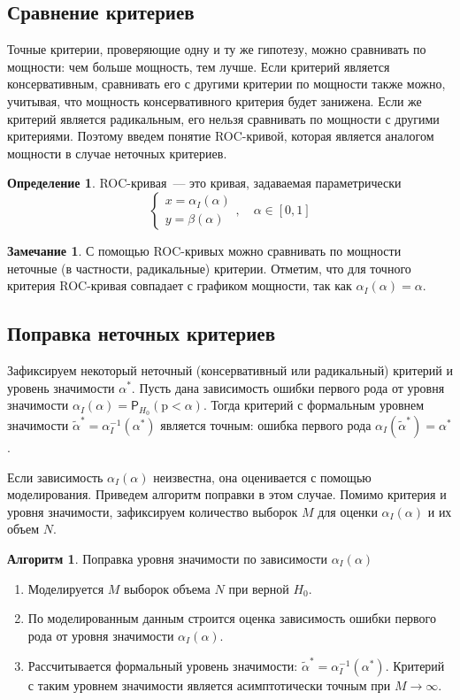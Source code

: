 \documentclass[specialist,
substylefile = spbu_report.rtx,
subf,href,colorlinks=true, 12pt]{disser}
\theoremstyle{definition}
\newtheorem{definition}{Определение}[section]
\newtheorem{algorithm}{Алгоритм}
\newtheorem{remark}{Замечание}[section]
\begin{document}
\subsection{Сравнение критериев}
Точные критерии, проверяющие одну и ту же гипотезу, можно сравнивать по мощности: чем больше мощность, тем лучше. Если критерий является консервативным, сравнивать его с другими критерии по мощности также можно, учитывая, что мощность консервативного критерия будет занижена. Если же критерий является радикальным, его нельзя сравнивать по мощности с другими критериями. Поэтому введем понятие ROC-кривой, которая является аналогом мощности в случае неточных критериев.
\begin{definition}
	ROC-кривая~--- это кривая, задаваемая параметрически
	\[
		\begin{cases}
			x=\alpha_I(\alpha) \\
			y=\beta(\alpha)
		\end{cases},\quad \alpha\in[0,1]
	\]
\end{definition}
\begin{remark}
	С помощью ROC-кривых можно сравнивать по мощности неточные (в частности, радикальные) критерии. Отметим, что для точного критерия ROC-кривая совпадает с графиком мощности, так как $\alpha_I(\alpha)=\alpha$.
\end{remark}

\subsection{Поправка неточных критериев}\label{sect:correction}
Зафиксируем некоторый неточный (консервативный или радикальный) критерий и уровень значимости $\alpha^*$. Пусть дана зависимость ошибки первого рода от уровня значимости $\alpha_I(\alpha)=\mathsf P_{H_0}(\mathrm p < \alpha)$. Тогда критерий с формальным уровнем значимости $\widetilde\alpha^*=\alpha_I^{-1}(\alpha^*)$ является точным: ошибка первого рода $\alpha_I(\widetilde\alpha^*)=\alpha^*$.

Если зависимость $\alpha_I(\alpha)$ неизвестна, она оценивается с помощью моделирования. Приведем алгоритм поправки в этом случае. Помимо критерия и уровня значимости, зафиксируем количество выборок $M$ для оценки $\alpha_I(\alpha)$ и их объем $N$.
\begin{algorithm}{Поправка уровня значимости по зависимости $\alpha_I(\alpha)$}~\cite{Larin2022}\label{alg:correction}
	\begin{enumerate}
		\item Моделируется $M$ выборок объема $N$ при верной $H_0$.
		\item По моделированным данным строится оценка зависимость ошибки первого рода от уровня значимости $\alpha_I(\alpha)$.
		\item Рассчитывается формальный уровень значимости: $\widetilde{\alpha}^*=\alpha_I^{-1}(\alpha^*)$. Критерий с таким уровнем значимости является асимптотически точным при $M\to\infty$.
	\end{enumerate}
\end{algorithm}
\end{document}

